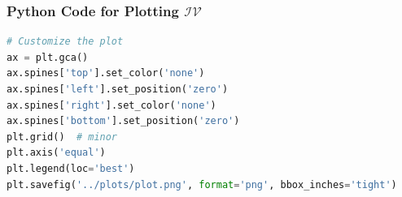 \documentclass{beamer}
\theoremstyle{remark}
\numberwithin{equation}{section}
\begin{document}
\begin{frame}[fragile]
\frametitle{Python Code for Plotting $\mathcal{IV}$}
\begin{lstlisting}[language=Python]
# Customize the plot
ax = plt.gca()
ax.spines['top'].set_color('none')
ax.spines['left'].set_position('zero')
ax.spines['right'].set_color('none')
ax.spines['bottom'].set_position('zero')
plt.grid()  # minor
plt.axis('equal')
plt.legend(loc='best')
plt.savefig('../plots/plot.png', format='png', bbox_inches='tight')
\end{lstlisting}
\end{frame}
\end{document}
